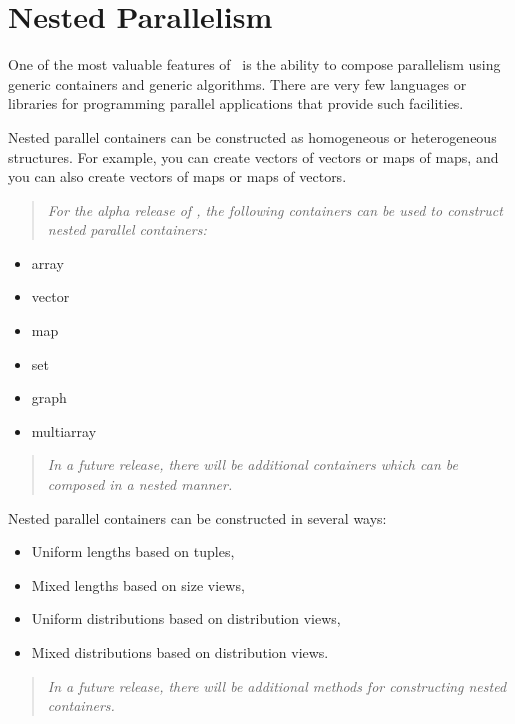 \documentclass{report}
\begin{document}

\chapter{Nested Parallelism}

One of the most valuable features of \stapl\ is the ability to
compose parallelism using generic containers and generic algorithms.
There are very few languages or libraries for programming parallel
applications that provide such facilities.

Nested parallel containers can be constructed as homogeneous or
heterogeneous structures.  For example, you can create vectors of vectors
or maps of maps, and you can also create vectors of maps or maps of vectors.

\begin{quote}
\emph{For the alpha release of \stapl, the following
containers can be used to construct nested parallel containers:}
\end{quote}

\begin{itemize}
\item array
\item vector
\item map
\item set
\item graph
\item multiarray
\end{itemize}

\begin{quote}
\emph{In a future release, there will be additional containers which can be
composed in a nested manner.}
\end{quote}

Nested parallel containers can be constructed in several ways:

\begin{itemize}
\item
Uniform lengths based on tuples,
\item
Mixed lengths based on size views,
\item
Uniform distributions based on distribution views,
\item
Mixed distributions based on distribution views.
\end{itemize}

\begin{quote}
\emph{In a future release, there will be additional methods for constructing
nested containers.}
\end{quote}
\end{document}

